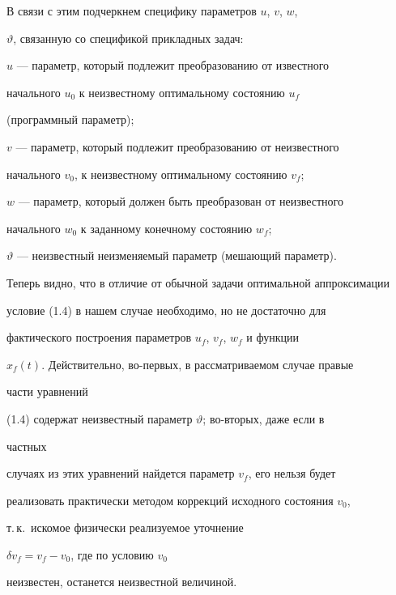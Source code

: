  


В связи с этим подчеркнем специфику параметров $u$, $v$, $w$, 


$\vartheta$, связанную со спецификой прикладных задач: 


 


$u$ --- параметр, который подлежит преобразованию от известного 


начального $u_0$ к неизвестному оптимальному состоянию $u_f$ 


(программный параметр); 


 


$v$ --- параметр, который подлежит преобразованию от неизвестного 


начального $v_0$, к неизвестному оптимальному состоянию $v_f$; 


 


$w$ --- параметр, который должен быть преобразован от неизвестного 


начального $w_0$ к заданному конечному состоянию $w_f$; 


 


$\vartheta$ --- неизвестный неизменяемый параметр (мешающий параметр). 


 


Теперь видно, что в отличие от обычной задачи оптимальной аппроксимации 


условие (1.4) в нашем случае необходимо, но не достаточно для 


фактического построения параметров $u_f$, $v_f$, $w_f$ и функции 


$x_f(t)$. Действительно, во-первых, в рассматриваемом случае правые 


части уравнений 


(1.4) содержат неизвестный параметр $\vartheta$; во-вторых, даже если в 


частных 


случаях из этих уравнений найдется параметр $v_f$, его нельзя будет 


реализовать практически методом коррекций исходного состояния $v_0$, 


т.\,к.~искомое физически реализуемое уточнение 


$\delta v_f=v_f-v_0$, где по условию $v_0$ 


неизвестен, останется неизвестной величиной.  


